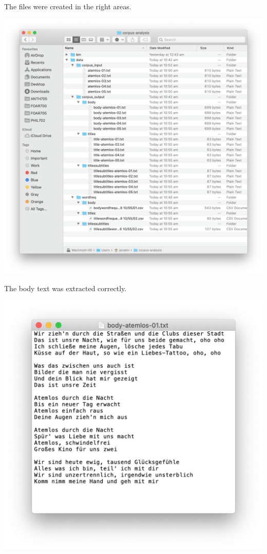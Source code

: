 \documentclass{article}
\begin{document}
The files were created in the right areas.

\includegraphics[width=\textwidth]{uat03.png}

The body text was extracted correctly.

\includegraphics[width=\textwidth]{uat04.png}
\end{document}
